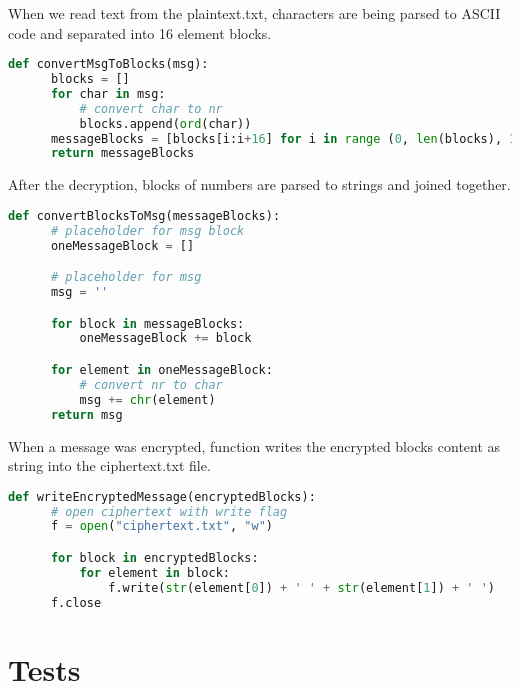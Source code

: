 \documentclass[a4paper,12pt]{article}
\begin{document}
When we read text from the plaintext.txt, characters are being parsed to ASCII code and separated into 16 element blocks.
\begin{lstlisting}[language=Python]
    def convertMsgToBlocks(msg):
      blocks = []
      for char in msg:
          # convert char to nr
          blocks.append(ord(char))
      messageBlocks = [blocks[i:i+16] for i in range (0, len(blocks), 16)]
      return messageBlocks  
\end{lstlisting}
\newpage
After the decryption, blocks of numbers are parsed to strings and joined together.
\begin{lstlisting}[language=Python]
    def convertBlocksToMsg(messageBlocks):
      # placeholder for msg block
      oneMessageBlock = []

      # placeholder for msg
      msg = ''

      for block in messageBlocks:
          oneMessageBlock += block

      for element in oneMessageBlock:
          # convert nr to char
          msg += chr(element)
      return msg 
\end{lstlisting}
When a message was encrypted, function writes the encrypted blocks content as string into the ciphertext.txt file.
\begin{lstlisting}[language=Python]
    def writeEncryptedMessage(encryptedBlocks):
      # open ciphertext with write flag
      f = open("ciphertext.txt", "w")

      for block in encryptedBlocks:
          for element in block:
              f.write(str(element[0]) + ' ' + str(element[1]) + ' ')
      f.close
\end{lstlisting}

\section{Tests}
\end{document}
